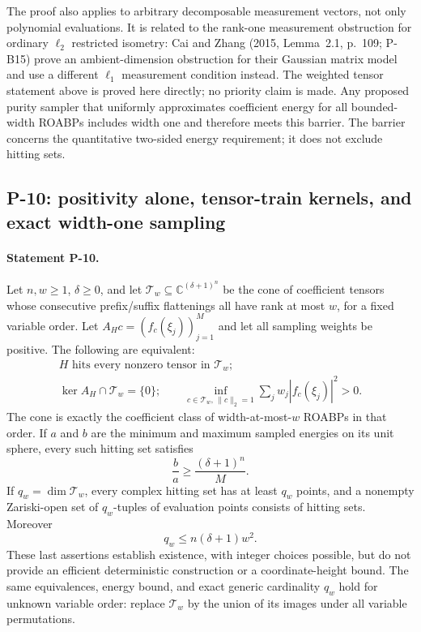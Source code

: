 \documentclass[11pt,a4paper]{article}
\theoremstyle{definition}\newtheorem{definition}{Definition}
\begin{document}
The proof also applies to arbitrary decomposable measurement vectors, not only polynomial evaluations. It is related to the rank-one measurement obstruction for ordinary $\ell_2$ restricted isometry: Cai and Zhang (2015, Lemma~2.1, p.~109; P-B15) prove an ambient-dimension obstruction for their Gaussian matrix model and use a different $\ell_1$ measurement condition instead. The weighted tensor statement above is proved here directly; no priority claim is made. Any proposed purity sampler that uniformly approximates coefficient energy for all bounded-width ROABPs includes width one and therefore meets this barrier. The barrier concerns the quantitative two-sided energy requirement; it does not exclude hitting sets.

\subsection{P-10: positivity alone, tensor-train kernels, and exact width-one sampling}
\paragraph{Statement P-10.}
Let $n,w\ge1$, $\delta\ge0$, and let $\mathcal T_w\subseteq\mathbb C^{(\delta+1)^n}$ be the cone of coefficient tensors whose consecutive prefix/suffix flattenings all have rank at most $w$, for a fixed variable order. Let $A_Hc=(f_c(\xi_j))_{j=1}^M$ and let all sampling weights be positive. The following are equivalent:
\[
\begin{gathered}
 H\text{ hits every nonzero tensor in }\mathcal T_w;\\
 \ker A_H\cap\mathcal T_w=\{0\};\qquad
 \inf_{c\in\mathcal T_w,\,\|c\|_2=1}
       \sum_jw_j|f_c(\xi_j)|^2>0.
\end{gathered}
 \tag{P10.1}
\]
The cone is exactly the coefficient class of width-at-most-$w$ ROABPs in that order. If $a$ and $b$ are the minimum and maximum sampled energies on its unit sphere, every such hitting set satisfies
\[
 \frac ba\ge\frac{(\delta+1)^n}{M}.
 \tag{P10.2}
\]
If $q_w=\dim\mathcal T_w$, every complex hitting set has at least $q_w$ points, and a nonempty Zariski-open set of $q_w$-tuples of evaluation points consists of hitting sets. Moreover
\[
 q_w\le n(\delta+1)w^2.
 \tag{P10.3}
\]
These last assertions establish existence, with integer choices possible, but do not provide an efficient deterministic construction or a coordinate-height bound.
The same equivalences, energy bound, and exact generic cardinality $q_w$ hold for unknown variable order: replace $\mathcal T_w$ by the union of its images under all variable permutations.
\end{document}
